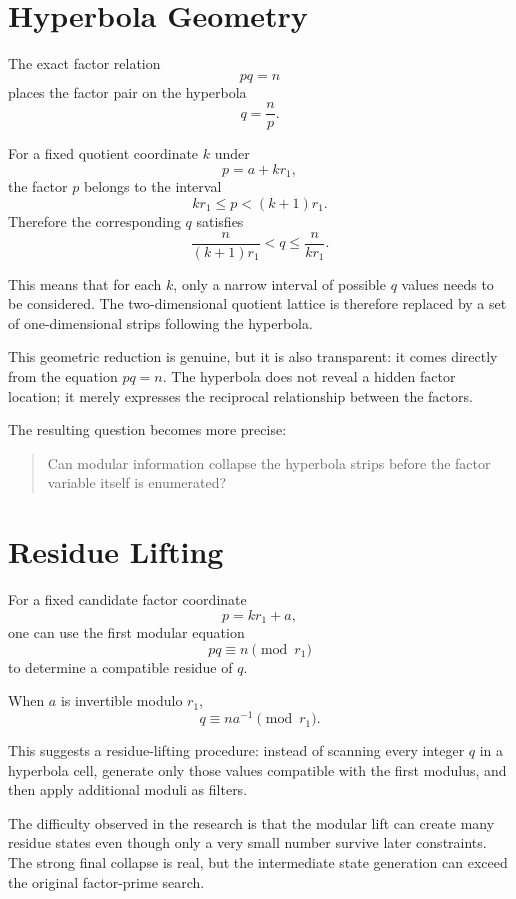 \documentclass[11pt,a4paper]{article}
\begin{document}
\section{Hyperbola Geometry}

The exact factor relation
\[
    pq=n
\]
places the factor pair on the hyperbola
\[
    q=\frac np.
\]

For a fixed quotient coordinate $k$ under
\[
    p=a+kr_1,
\]
the factor $p$ belongs to the interval
\[
    kr_1\leq p<(k+1)r_1.
\]
Therefore the corresponding $q$ satisfies
\[
    \frac{n}{(k+1)r_1}<q\leq\frac{n}{kr_1}.
\]

This means that for each $k$, only a narrow interval of possible $q$ values needs to be considered. The two-dimensional quotient lattice is therefore replaced by a set of one-dimensional strips following the hyperbola.

This geometric reduction is genuine, but it is also transparent: it comes directly from the equation $pq=n$. The hyperbola does not reveal a hidden factor location; it merely expresses the reciprocal relationship between the factors.

The resulting question becomes more precise:

\begin{quote}
Can modular information collapse the hyperbola strips before the factor variable itself is enumerated?
\end{quote}

\section{Residue Lifting}

For a fixed candidate factor coordinate
\[
    p=kr_1+a,
\]
one can use the first modular equation
\[
    pq\equiv n\pmod{r_1}
\]
to determine a compatible residue of $q$.

When $a$ is invertible modulo $r_1$,
\[
    q\equiv na^{-1}\pmod{r_1}.
\]

This suggests a residue-lifting procedure: instead of scanning every integer $q$ in a hyperbola cell, generate only those values compatible with the first modulus, and then apply additional moduli as filters.

The difficulty observed in the research is that the modular lift can create many residue states even though only a very small number survive later constraints. The strong final collapse is real, but the intermediate state generation can exceed the original factor-prime search.
\end{document}

